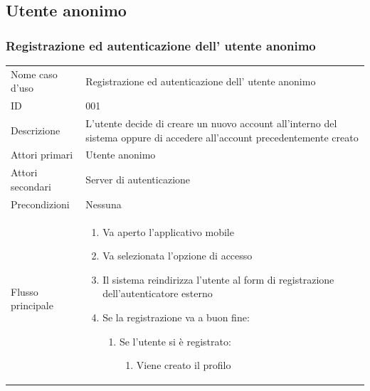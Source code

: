 \documentclass{article}
\begin{document}
\subsection{Utente anonimo}

\subsubsection{Registrazione ed autenticazione dell' utente anonimo}

\begin{table}[htbp]
    \centering
    \begin{tabularx}{\textwidth}{| l | p{} |}
        \Xhline{2pt} %
        Nome caso d'uso & Registrazione ed autenticazione dell' utente anonimo \\
        \Xhline{2pt} %
        ID & 001 \\
        \hline
        Descrizione & L'utente decide di creare un nuovo account all'interno del sistema oppure di accedere all'account precedentemente creato\\
        \hline
        Attori primari & Utente anonimo \\
        \hline
        Attori secondari & Server di autenticazione \\
        \hline
        Precondizioni & Nessuna \\
        \hline
        Flusso principale & 
        \begin{enumerate}[topsep=5pt,partopsep=0pt,parsep=0pt,itemsep=0pt,before=\vspace{-\baselineskip},after=\vspace{-\baselineskip}]                
            \item Va aperto l'applicativo mobile
            \item Va selezionata l'opzione di accesso
            \item Il sistema reindirizza l'utente al form di registrazione dell'autenticatore esterno
            \item Se la registrazione va a buon fine:
            \begin{enumerate}[leftmargin=*, nosep]
                \item Se l'utente si è registrato:
                \begin{enumerate}[leftmargin=*, nosep]
                    \item Viene creato il profilo

\end{enumerate}
\end{enumerate}
\end{enumerate}
\end{tabularx}
\end{table}
\end{document}
